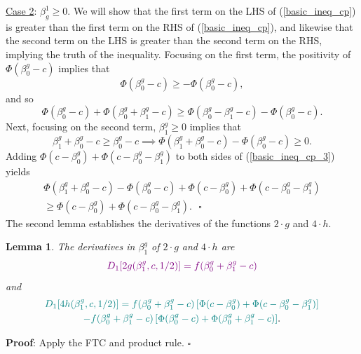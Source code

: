 \documentclass[12pt]{article}
\newtheorem{lemma}{Lemma}
\begin{document}
\noindent
\underline{Case 2}: $\beta^1_g \geq 0.$  We will show that the first term on the LHS of (\ref{basic_ineq_cp}) is greater than the first term on the RHS of (\ref{basic_ineq_cp}), and likewise that the second term on the LHS is greater than the second term on the RHS, implying the truth of the inequality. Focusing on the first term, the positivity of $\Phi(\beta^g_0 -c)$ implies that
$$ \Phi(\beta^g_0 - c) \geq - \Phi(\beta^g_0 - c),$$ and so
$$ \Phi(\beta^g_0 - c) + \Phi(\beta^g_0 + \beta^g_1 - c) \geq \Phi(\beta^g_0 - \beta^g_1 - c) - \Phi(\beta^g_0 - c).$$
Next, focusing on the second term, $\beta^g_1 \geq 0$ implies that 
\begin{equation}\label{basic_ineq_cp_3}
\beta^g_1 + \beta^g_0 - c \geq \beta^g_0 - c \implies \Phi(\beta^g_1 + \beta^g_0 - c) - \Phi(\beta^g_0 - c) \geq 0.
\end{equation}
Adding $\Phi(c - \beta^g_0) + \Phi(c - \beta^g_0 - \beta^g_1)$ to both sides of (\ref{basic_ineq_cp_3}) yields
\begin{multline*}
\Phi(\beta^g_1 + \beta^g_0 - c) - \Phi(\beta^g_0 - c) + \Phi(c - \beta^g_0) + \Phi(c - \beta^g_0 - \beta^g_1) \\ \geq \Phi(c - \beta^g_0) + \Phi(c - \beta^g_0 - \beta^g_1). \textrm{ } \square
\end{multline*}
The second lemma establishes the derivatives of the functions $2\cdot g$ and $4 \cdot h$.
\begin{lemma}
The derivatives in $\beta^g_1$ of $2\cdot g$ and $4\cdot h$ are
\begin{equation}\label{dg_dbeta}
\textcolor{violet}{D_1[2g(\beta^g_1, c, 1/2)] = f(\beta^g_0 + \beta^g_1 - c)}
\end{equation}
and
\begin{multline}\label{dh_dbeta}
\textcolor{teal}{D_1[4h(\beta^g_1, c, 1/2)] = f(\beta^g_0 + \beta^g_1 - c) \left[\Phi(c - \beta^g_0) + \Phi(c - \beta_0^g - \beta_1^g) \right]} \\ \textcolor{teal}{- f(\beta^g_0 + \beta^g_1 - c) \left[\Phi(\beta_0^g - c) + \Phi(\beta^g_0 + \beta^g_1 - c) \right]}.\end{multline}
\end{lemma}
\textbf{Proof}: Apply the FTC and product rule. $\square$
\end{document}
